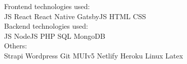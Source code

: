 \documentclass[letterpaper]{algo-resume}
\begin{document}
\begin{minipage}[t]{0.66\textwidth}
Frontend technologies used:\\
JS \textbullet{} React \textbullet{} React Native \textbullet{} GatsbyJS \textbullet{} HTML \textbullet{}  CSS\\
Backend technologies used:\\
JS \textbullet{} NodeJS \textbullet{} PHP \textbullet{} SQL \textbullet{} MongoDB \\
Others:\\
Strapi \textbullet{} Wordpress \textbullet{} Git \textbullet{} MUIv5 \textbullet{} Netlify \textbullet{} Heroku \textbullet{} Linux \textbullet{} Latex



\sectionspace 



\end{minipage} 
\end{document}
